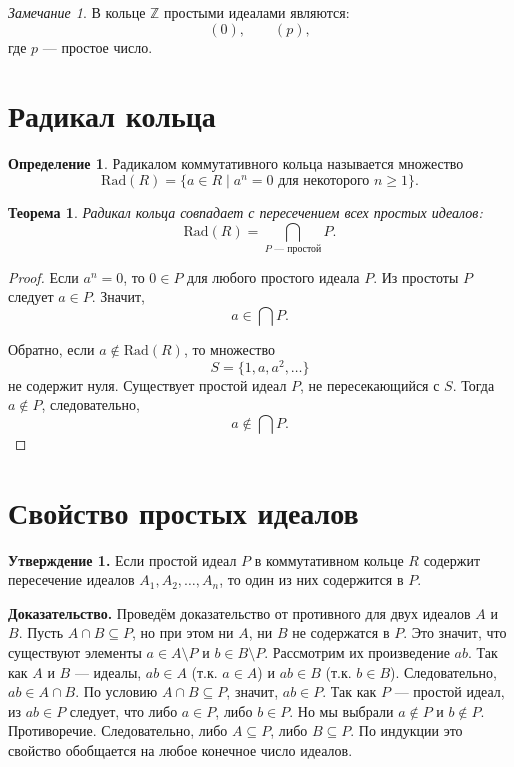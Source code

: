 \documentclass[12pt, a4paper]{article}
\newtheorem{theorem}{Теорема}
\theoremstyle{definition}
\newtheorem{definition}{Определение}
\theoremstyle{remark}
\newtheorem*{remark}{Замечание}
\begin{document}
\begin{remark}
	В кольце $\mathbb{Z}$ простыми идеалами являются:
	\[
	(0), \qquad (p),
	\]
	где $p$ --- простое число.
\end{remark}

\section{Радикал кольца}

\begin{definition}
	Радикалом коммутативного кольца называется множество
	\[
	\mathrm{Rad}(R)=\{a\in R\mid a^n=0 \text{ для некоторого } n\ge1\}.
	\]
\end{definition}

\begin{theorem}
	Радикал кольца совпадает с пересечением всех простых идеалов:
	\[
	\mathrm{Rad}(R)=\bigcap_{P\text{ --- простой}} P.
	\]
\end{theorem}

\begin{proof}
	Если $a^n=0$, то $0\in P$ для любого простого идеала $P$. Из простоты $P$ следует $a\in P$. Значит,
	\[
	a\in \bigcap P.
	\]
	
	Обратно, если $a\notin \mathrm{Rad}(R)$, то множество
	\[
	S=\{1,a,a^2,\dots\}
	\]
	не содержит нуля. Существует простой идеал $P$, не пересекающийся с $S$. Тогда $a\notin P$, следовательно,
	\[
	a\notin \bigcap P.
	\]
\end{proof}

\section{Свойство простых идеалов}

\textbf{Утверждение 1.} Если простой идеал $P$ в коммутативном кольце $R$ содержит пересечение идеалов $A_1, A_2, \dots, A_n$, то один из них содержится в $P$.

\textbf{Доказательство.} Проведём доказательство от противного для двух идеалов $A$ и $B$. Пусть $A \cap B \subseteq P$, но при этом ни $A$, ни $B$ не содержатся в $P$. 
Это значит, что существуют элементы $a \in A \setminus P$ и $b \in B \setminus P$.
Рассмотрим их произведение $ab$. 
Так как $A$ и $B$ — идеалы, $ab \in A$ (т.к. $a \in A$) и $ab \in B$ (т.к. $b \in B$). 
Следовательно, $ab \in A \cap B$.
По условию $A \cap B \subseteq P$, значит, $ab \in P$.
Так как $P$ — простой идеал, из $ab \in P$ следует, что либо $a \in P$, либо $b \in P$. 
Но мы выбрали $a \notin P$ и $b \notin P$. Противоречие. Следовательно, либо $A \subseteq P$, либо $B \subseteq P$. 
По индукции это свойство обобщается на любое конечное число идеалов.
\end{document}
